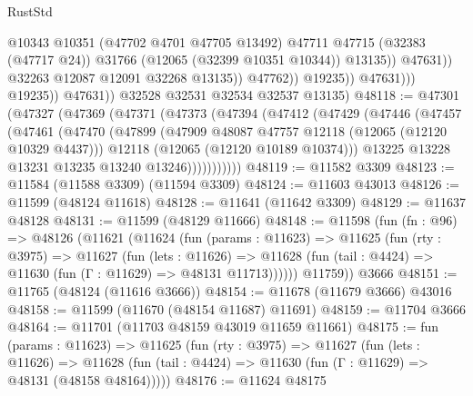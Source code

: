 \begin{lexlean}{RustStd}
\begin{coremodule}
                                        @10343
                                        @10351
                                        (@47702 @4701 @47705 @13492)
                                        @47711
                                        @47715
                                        (@32383 (@47717 @24))
                                        @31766
                                        (@12065 (@32399 @10351 @10344))
                                        @13135))
                                    @47631))
                                @32263
                                @12087
                                @12091
                                @32268
                                @13135))
                            @47762))
                        @19235))
                    @47631)))
              @19235))
          @47631))
      @32528
      @32531
      @32534
      @32537
      @13135)
@48118 := @47301
    (@47327
      (@47369
        (@47371
          (@47373
            (@47394
              (@47412
                (@47429
                  (@47446
                    (@47457
                      (@47461
                        (@47470
                          (@47899
                            (@47909 @48087 @47757 @12118 (@12065 (@12120 @10329 @4437)))
                            @12118
                            (@12065 (@12120 @10189 @10374)))
                          @13225
                          @13228
                          @13231
                          @13235
                          @13240
                          @13246)))))))))))
@48119 := @11582 @3309
@48123 := @11584 (@11588 @3309) (@11594 @3309)
@48124 := @11603 @43013
@48126 := @11599 (@48124 @11618)
@48128 := @11641 (@11642 @3309)
@48129 := @11637 @48128
@48131 := @11599 (@48129 @11666)
@48148 := @11598
    (fun (fn : @96) =>
    @48126
      (@11621
        (@11624
          (fun (params : @11623) =>
          @11625
            (fun (rty : @3975) =>
            @11627
              (fun (lets : @11626) =>
              @11628 (fun (tail : @4424) => @11630 (fun (Γ : @11629) => @48131 @11713))))))
        @11759))
    @3666
@48151 := @11765 (@48124 (@11616 @3666))
@48154 := @11678 (@11679 @3666) @43016
@48158 := @11599 (@11670 (@48154 @11687) @11691)
@48159 := @11704 @3666
@48164 := @11701 (@11703 @48159 @43019 @11659 @11661)
@48175 := fun (params : @11623) =>
  @11625
    (fun (rty : @3975) =>
    @11627
      (fun (lets : @11626) =>
      @11628 (fun (tail : @4424) => @11630 (fun (Γ : @11629) => @48131 (@48158 @48164)))))
@48176 := @11624 @48175

\end{coremodule}
\end{lexlean}
